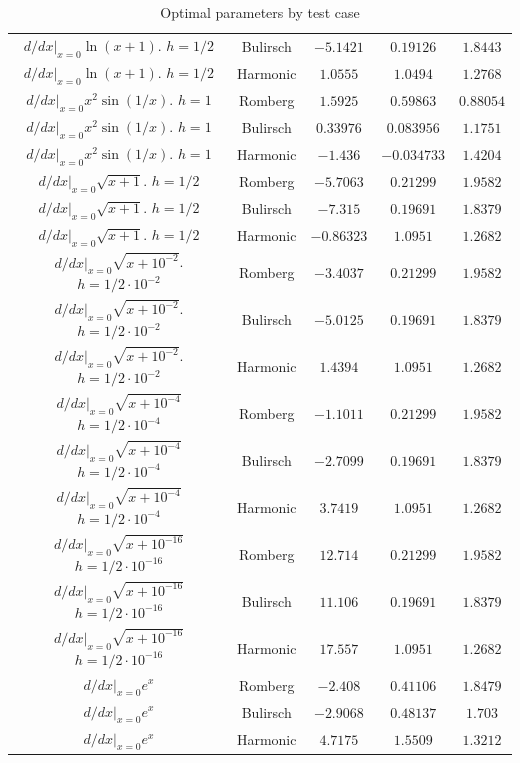\begin{table}[H]
\begin{tabular}{c|c||c|c|c}
$d/dx|_{x=0} \ln(x + 1)$. $h=1/2$ & Bulirsch & \(-5.1421\) & \(0.19126\) & \(1.8443\) \\
$d/dx|_{x=0} \ln(x + 1)$. $h=1/2$ & Harmonic & \(1.0555\) & \(1.0494\) & \(1.2768\) \\
$d/dx|_{x=0} x^2 \sin(1/x)$. $h=1$ & Romberg & \(1.5925\) & \(0.59863\) & \(0.88054\) \\
$d/dx|_{x=0} x^2 \sin(1/x)$. $h=1$ & Bulirsch & \(0.33976\) & \(0.083956\) & \(1.1751\) \\
$d/dx|_{x=0} x^2 \sin(1/x)$. $h=1$ & Harmonic & \(-1.436\) & \(-0.034733\) & \(1.4204\) \\
$d/dx|_{x=0} \sqrt{x + 1}$. $h=1/2$ & Romberg & \(-5.7063\) & \(0.21299\) & \(1.9582\) \\
$d/dx|_{x=0} \sqrt{x + 1}$. $h=1/2$ & Bulirsch & \(-7.315\) & \(0.19691\) & \(1.8379\) \\
$d/dx|_{x=0} \sqrt{x + 1}$. $h=1/2$ & Harmonic & \(-0.86323\) & \(1.0951\) & \(1.2682\) \\
$d/dx|_{x=0}\sqrt{x + 10^{-2}}$. $h=1/2\cdot 10^{-2}$ & Romberg & \(-3.4037\) & \(0.21299\) & \(1.9582\) \\
$d/dx|_{x=0}\sqrt{x + 10^{-2}}$. $h=1/2\cdot 10^{-2}$ & Bulirsch & \(-5.0125\) & \(0.19691\) & \(1.8379\) \\
$d/dx|_{x=0}\sqrt{x + 10^{-2}}$. $h=1/2\cdot 10^{-2}$ & Harmonic & \(1.4394\) & \(1.0951\) & \(1.2682\) \\
$d/dx|_{x=0}\sqrt{x + 10^{-4}}$ $h=1/2\cdot 10^{-4}$ & Romberg & \(-1.1011\) & \(0.21299\) & \(1.9582\) \\
$d/dx|_{x=0}\sqrt{x + 10^{-4}}$ $h=1/2\cdot 10^{-4}$ & Bulirsch & \(-2.7099\) & \(0.19691\) & \(1.8379\) \\
$d/dx|_{x=0}\sqrt{x + 10^{-4}}$ $h=1/2\cdot 10^{-4}$ & Harmonic & \(3.7419\) & \(1.0951\) & \(1.2682\) \\
$d/dx|_{x=0}\sqrt{x + 10^{-16}}$ $h=1/2\cdot 10^{-16}$ & Romberg & \(12.714\) & \(0.21299\) & \(1.9582\) \\
$d/dx|_{x=0}\sqrt{x + 10^{-16}}$ $h=1/2\cdot 10^{-16}$ & Bulirsch & \(11.106\) & \(0.19691\) & \(1.8379\) \\
$d/dx|_{x=0}\sqrt{x + 10^{-16}}$ $h=1/2\cdot 10^{-16}$ & Harmonic & \(17.557\) & \(1.0951\) & \(1.2682\) \\
$d/dx|_{x=0}e^x$ & Romberg & \(-2.408\) & \(0.41106\) & \(1.8479\) \\
$d/dx|_{x=0}e^x$ & Bulirsch & \(-2.9068\) & \(0.48137\) & \(1.703\) \\
$d/dx|_{x=0}e^x$ & Harmonic & \(4.7175\) & \(1.5509\) & \(1.3212\) \\
    \end{tabular}
    \caption{Optimal parameters by test case}
    \label{tab:my_label}
\end{table}

